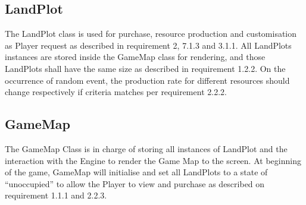 \subsection{LandPlot}
The LandPlot class is used for purchase, resource production and customisation as Player request as described in requirement 2, 7.1.3 and 3.1.1.
All LandPlots instances are stored inside the GameMap class for rendering, and those LandPlots shall have the same size as described in requirement 1.2.2.
On the occurrence of random event, the production rate for different resources should change respectively if criteria matches per requirement 2.2.2. 

\subsection{GameMap}
The GameMap Class is in charge of storing all instances of LandPlot and the interaction with the Engine to render the Game Map to the screen.
At beginning of the game, GameMap will initialise and set all LandPlots to a state of “unoccupied” to allow the Player to view and purchase as described on requirement 1.1.1 and 2.2.3.

